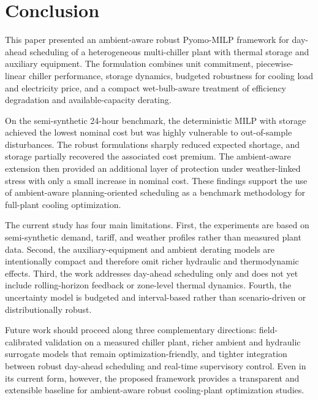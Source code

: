 \section{Conclusion}
\label{sec:conclusion}

This paper presented an ambient-aware robust Pyomo-MILP framework for day-ahead scheduling of a heterogeneous multi-chiller plant with thermal storage and auxiliary equipment. The formulation combines unit commitment, piecewise-linear chiller performance, storage dynamics, budgeted robustness for cooling load and electricity price, and a compact wet-bulb-aware treatment of efficiency degradation and available-capacity derating.

On the semi-synthetic 24-hour benchmark, the deterministic MILP with storage achieved the lowest nominal cost but was highly vulnerable to out-of-sample disturbances. The robust formulations sharply reduced expected shortage, and storage partially recovered the associated cost premium. The ambient-aware extension then provided an additional layer of protection under weather-linked stress with only a small increase in nominal cost. These findings support the use of ambient-aware planning-oriented scheduling as a benchmark methodology for full-plant cooling optimization.

The current study has four main limitations. First, the experiments are based on semi-synthetic demand, tariff, and weather profiles rather than measured plant data. Second, the auxiliary-equipment and ambient derating models are intentionally compact and therefore omit richer hydraulic and thermodynamic effects. Third, the work addresses day-ahead scheduling only and does not yet include rolling-horizon feedback or zone-level thermal dynamics. Fourth, the uncertainty model is budgeted and interval-based rather than scenario-driven or distributionally robust.

Future work should proceed along three complementary directions: field-calibrated validation on a measured chiller plant, richer ambient and hydraulic surrogate models that remain optimization-friendly, and tighter integration between robust day-ahead scheduling and real-time supervisory control. Even in its current form, however, the proposed framework provides a transparent and extensible baseline for ambient-aware robust cooling-plant optimization studies.
